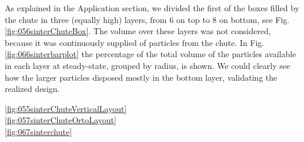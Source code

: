 As explained in the Application section, we divided the first of the boxes
filled by the chute in three (equally high) layers, from 6 on top to 8 
on bottom, see Fig. \ref{fig:056sinterChuteBox}. 
The volume over these layers was not considered, because it was continuously 
supplied of particles from the chute. In Fig. \ref{fig:066sinterbarplot} the
percentage of the total volume of the particles available in each layer at steady-state, 
grouped by radius, is shown. 
We could clearly see how the larger particles disposed mostly 
in the bottom layer, validating the realized design.



\ref{fig:055sinterChuteVerticalLayout} \\





\ref{fig:057sinterChuteOrtoLayout} \\




\ref{fig:067sinterchute}\\